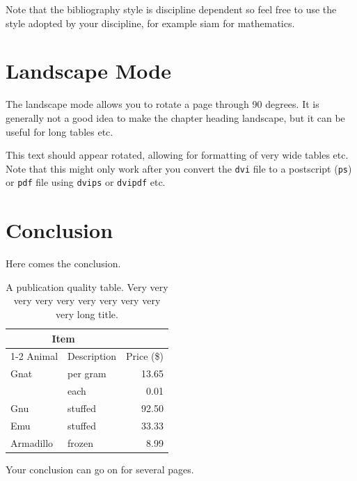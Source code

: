 Note that the bibliography style is discipline dependent so feel free to use the style adopted by your discipline, for example siam for mathematics.

\chapter{Landscape Mode}
The landscape mode allows you to rotate a page through 90 degrees.  It
is generally not a good idea to make the chapter heading landscape,
but it can be useful for long tables etc.

\begin{landscape}
  This text should appear rotated, allowing for formatting of very
  wide tables etc.  Note that this might only work after you convert
  the \texttt{dvi} file to a postscript (\texttt{ps}) or \texttt{pdf}
  file using \texttt{dvips} or \texttt{dvipdf} etc.
\end{landscape}

\chapter{Conclusion}
Here comes the conclusion.
\begin{table}[tbph]
\centering
\caption{A publication quality table. Very very very very very very very very very very long title.
\label{table:food1}}
\begin{tabular}{@{}llr@{}} \toprule 
\multicolumn{2}{c}{Item} \\ \cmidrule(r){1-2} 
Animal & Description & Price (\$)\\ \midrule 
Gnat & per gram & 13.65 \\ 
& each & 0.01 \\ 
Gnu & stuffed & 92.50 \\ 
Emu & stuffed & 33.33 \\ 
Armadillo & frozen & 8.99 \\ \bottomrule 
\end{tabular}
\end{table}

\newpage
Your conclusion can go on for several pages.